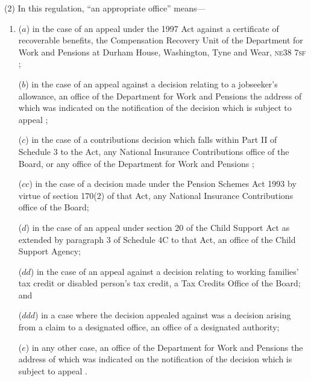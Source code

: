 \documentclass[12pt,a4paper]{article}
\begin{document}
(2) In this regulation, “an appropriate office” means—
\begin{enumerate}\item[]
($a$) in the case of an appeal under the 1997 Act against a certificate of recoverable benefits, the Compensation Recovery Unit of the 
Department for Work and Pensions  %
at 
Durham House, Washington, Tyne and Wear, \textsc{\lowercase{NE38 7SF}}%
;

($b$) in the case of an appeal against a decision relating to a jobseeker’s allowance, an office of the 
Department for Work and Pensions the address of which was indicated on the notification of the decision which is subject to appeal%
;

($c$) in the case of a contributions decision which falls within Part II of Schedule 3 to the Act, any National Insurance Contributions office
of the Board, or any office of the 
Department for Work and Pensions%
;  %

($cc$) in the case of a decision made under the Pension Schemes Act 1993 by virtue of section 170(2) of that Act, any National Insurance Contributions office of the Board;

($d$) in the case of an appeal under section 20 of the Child Support Act as extended by paragraph 3 of Schedule 4C to that Act, an office of the Child Support Agency; %

($dd$) in the case of an appeal against a decision relating to working families' tax credit or disabled person’s tax credit, a Tax Credits Office of the Board; and

($ddd$) in a case where the decision appealed against was a decision arising from a claim to a designated office, an office of a designated authority;

($e$) in any other case, an office of the 
Department for Work and Pensions the address of which was indicated on the notification of the decision which is subject to appeal%
.
\end{enumerate}
\end{document}
